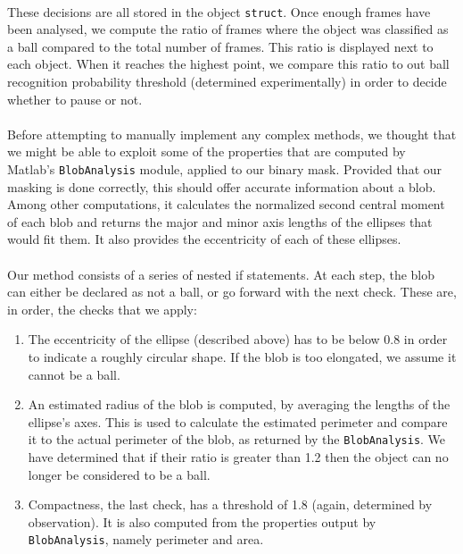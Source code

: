\documentclass[10pt,a4paper]{article}
\begin{document}
\paragraph{} These decisions are all stored in the object \texttt{struct}. Once enough frames have been analysed, we compute the ratio of frames where the object was classified as a ball compared to the total number of frames. This ratio is displayed next to each object. When it reaches the highest point, we compare this ratio to out ball recognition probability threshold (determined experimentally) in order to decide whether to pause or not.
\paragraph{} Before attempting to manually implement any complex methods, we thought that we might be able to exploit some of the properties that are computed by Matlab's \texttt{BlobAnalysis} module, applied to our binary mask. Provided that our masking is done correctly, this should offer accurate information about a blob. Among other computations, it calculates the normalized second central moment of each blob and returns the major and minor axis lengths of the ellipses that would fit them. It also provides the eccentricity of each of these ellipses.
\paragraph{} Our method consists of a series of nested if statements. At each step, the blob can either be declared as not a ball, or go forward with the next check. These are, in order, the checks that we apply:

\begin{enumerate}
\item The eccentricity of the ellipse (described above) has to be below 0.8 in order to indicate a roughly circular shape. If the blob is too elongated, we assume it cannot be a ball.
\item An estimated radius of the blob is computed, by averaging the lengths of the ellipse's axes. This is used to calculate the estimated perimeter and compare it to the actual perimeter of the blob, as returned by the \texttt{BlobAnalysis}. We have determined that if their ratio is greater than 1.2 then the object can no longer be considered to be a ball.
\item Compactness, the last check, has a threshold of 1.8 (again, determined by observation). It is also computed from the properties output by \texttt{BlobAnalysis}, namely perimeter and area.
\end{enumerate}
\end{document}
